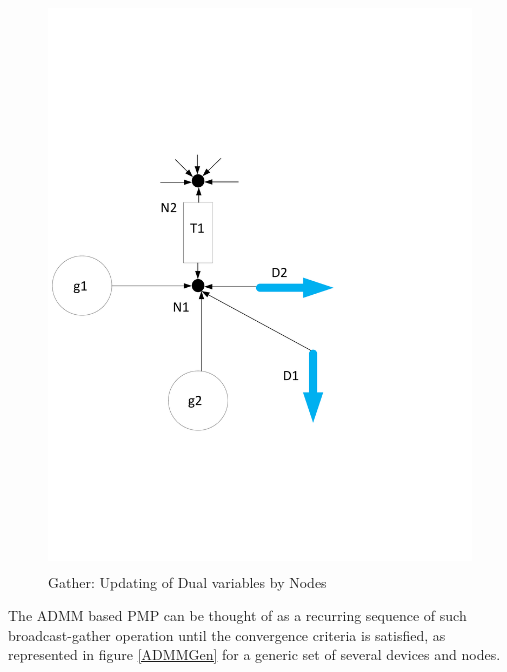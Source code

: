 \documentclass[preprint,12pt,3p]{elsarticle}
\begin{document}
\begin{figure}
\begin{center}
\vspace*{-4cm}
\includegraphics[height=15cm,width=20cm]{Prox_OPF2.pdf}
\caption{Gather: Updating of Dual variables by Nodes}
\label{Gather}
\end{center}
\end{figure}
The ADMM based PMP can be thought of as a recurring sequence of such broadcast-gather operation until the convergence criteria is satisfied, as represented in figure \ref{ADMMGen} for a generic set of several devices and nodes.
\end{document}
